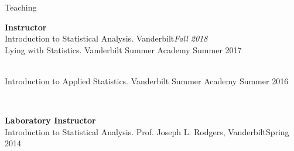 \begin{rSection}{\textrm{Teaching}}
\vspace*{2pt}
\begin{minipage}{\linewidth}{\large {\bf Instructor}\\}
Introduction to Statistical Analysis. Vanderbilt\hfill {\textit{Fall 2018}}\smallskip\\
Lying with Statistics. Vanderbilt Summer Academy \hfill{Summer 2017}%
\begin{comment}
\begin{quote}\small ....
\end{quote}
\end{comment}
\smallskip\\
Introduction to Applied Statistics. Vanderbilt Summer Academy \hfill{Summer 2016}%
\begin{comment}\begin{quote}\small Course Description: Media stories about ``the latest scientific findings'' can range from the plausible to the silly. This class will help you learn to separate truth from  fiction by introducing you to the basic statistical methods and tools used in psychological  research. You will learn to use \R, a free and powerful statistical software package, to conduct and interpret basic scientific statistical tests. You will begin to recognize the difference between proper and improper use of data, especially the distinction between correlation and causation (\textit{e.g.}, why margarine consumption does not actually lead to more divorces in the state of Maine). For the final project, you will formulate and answer your own scientific question using these new tools and real psychology data.
\end{quote}\end{comment}
\end{minipage}
\smallskip\\
\begin{minipage}{\linewidth}{\large {\bf Laboratory Instructor}\\}
Introduction to Statistical Analysis. Prof. Joseph L. Rodgers, Vanderbilt\hfill  {Spring 2014}%

\end{minipage}
\end{rSection}

